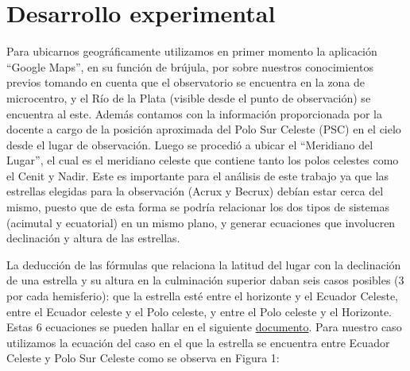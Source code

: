 \documentclass[12pt, a4paper]{article} %
\begin{document}
\section{Desarrollo experimental}
Para ubicarnos geográficamente utilizamos en primer momento la aplicación “Google Maps”, en su función de brújula, por sobre nuestros conocimientos previos tomando en cuenta que el observatorio se encuentra en la zona de microcentro, y el Río de la Plata (visible desde el punto de observación) se encuentra al este. Además contamos con la información proporcionada por la docente a cargo de la posición aproximada del Polo Sur Celeste (PSC) en el cielo desde el lugar de observación. Luego se procedió a ubicar el “Meridiano del Lugar”, el cual es el meridiano celeste que contiene tanto los polos celestes como el Cenit y Nadir. Este es importante para el análisis de este trabajo ya que las estrellas elegidas para la observación (Acrux y Becrux) debían estar cerca del mismo, puesto que de esta forma se podría relacionar los dos tipos de sistemas (acimutal y ecuatorial) en un mismo plano, y generar ecuaciones que involucren declinación y altura de las estrellas. 

La deducción de las fórmulas que relaciona la latitud del lugar con la declinación de una estrella y su altura en la culminación superior daban seis casos posibles (3 por cada hemisferio): que la estrella esté entre el horizonte y el Ecuador Celeste, entre el Ecuador celeste y el Polo celeste, y entre el Polo celeste y el Horizonte. Estas 6 ecuaciones se pueden hallar en el siguiente \href{https://github.com/ianchu0317/TP1-astronomia-cuadrantes/blob/main/files/ecuaciones_latitudes.pdf}{documento}. 
Para nuestro caso utilizamos la ecuación del caso en el que la estrella se encuentra entre Ecuador Celeste y Polo Sur Celeste como se observa en Figura 1:
\end{document}
